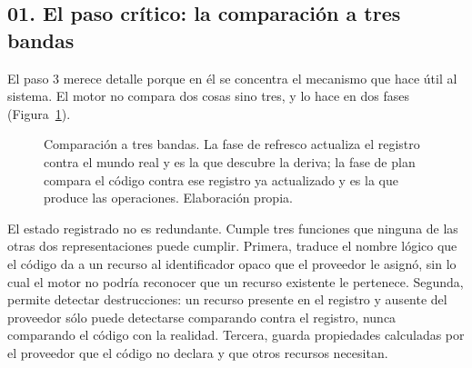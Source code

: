 \documentclass[11pt,letterpaper]{article}
\begin{document}
\subsection*{01. El paso crítico: la comparación a tres bandas}

El paso 3 merece detalle porque en él se concentra el mecanismo que hace útil
al sistema. El motor no compara dos cosas sino tres, y lo hace en dos fases
(Figura~\ref{fig:tresbandas}).

\begin{figure}[ht]
  \centering
  \caption{Comparación a tres bandas. La fase de refresco actualiza el
  registro contra el mundo real y es la que descubre la deriva; la fase de
  plan compara el código contra ese registro ya actualizado y es la que
  produce las operaciones. Elaboración propia.}
  \label{fig:tresbandas}
\end{figure}

El estado registrado no es redundante. Cumple tres funciones que ninguna de
las otras dos representaciones puede cumplir. Primera, traduce el nombre
lógico que el código da a un recurso al identificador opaco que el proveedor
le asignó, sin lo cual el motor no podría reconocer que un recurso existente
le pertenece. Segunda, permite detectar destrucciones: un recurso presente en
el registro y ausente del proveedor sólo puede detectarse comparando contra el
registro, nunca comparando el código con la realidad. Tercera, guarda
propiedades calculadas por el proveedor que el código no declara y que otros
recursos necesitan.
\end{document}
